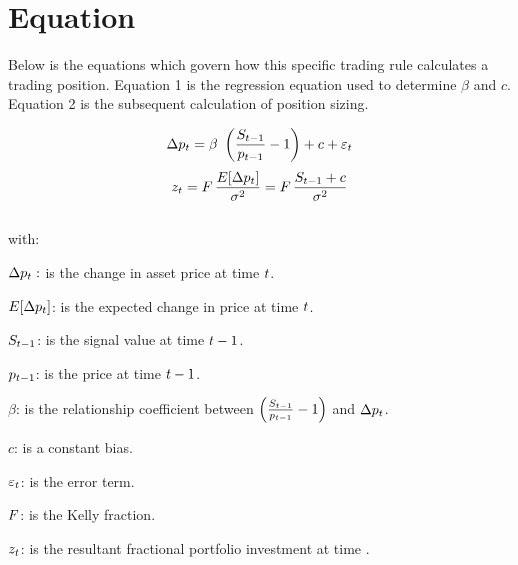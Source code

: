\documentclass{article}
\begin{document}
\logo
{} %
\tblofcontents

\introtorule

%

\trademethod

\outofsampleparameters

\section{Equation}
Below is the equations which govern how this specific trading rule calculates a trading position. Equation 1 is the regression equation used to determine $\beta$ and $c$. Equation 2 is the subsequent calculation of position sizing.

\begin{equation}
\label{eqn:SignalRegression}
\Delta \price_{\currenttime} = \beta \ \left(\frac{S_{\currenttime-1}}{\price_{\currenttime-1}}-1\right) + c + \varepsilon_{\currenttime}
\end{equation}
\begin{equation}
\label{eqn:portfolioallocation}
    z_{t} = F \, \frac{E[\Delta p_{t}]}{\sigma^{2}} = F \, \frac{S_{t-1} + c}{\sigma^{2}}
\end{equation}
\\
with:

$\Delta p_{t}:$ is the change in asset price at time $t$.

$E[\Delta p_{t}]$: is the expected change in price at time $t$.

$S_{t-1}$: is the signal value at time $t-1$.

$p_{t-1}$: is the price at time $t-1$.

$\beta$: is the relationship coefficient between $\left(\frac{S_{t-1}}{p_{t-1}}-1\right)$ and $\Delta p_{t}$.

$c$: is a constant bias.

$\varepsilon_{t}$: is the error term.

$F$: is the Kelly fraction.

$z_{t}$: is the resultant fractional portfolio investment at time \currenttime.


\keyterms
\furtherlinks %
\end{document}
